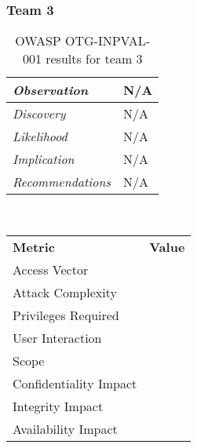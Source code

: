 \documentclass[headsepline,footsepline,footinclude=false,oneside,fontsize=11pt,paper=a4,listof=totoc,bibliography=totoc]{scrbook} %
\begin{document}
\subsubsection{Team 3}

\begin{table}[H]
	\centering
	\begin{tabular}{l p{11cm}}
		\textit{Observation} &  N/A\\
		\hline
		\textit{Discovery} &  N/A \\
		\hline
		\textit{Likelihood} & N/A\\
		\hline
		\textit{Implication} & N/A\\
		\hline
		\textit{Recommendations} & N/A\\
	\end{tabular}
	\caption{OWASP OTG-INPVAL-001 results for team 3}
	\label{table:scenario2}
\end{table}
\
\vspace{0.5cm}
\
\begin{center}
	\begin{tabular}{ll}
		\rowcolor[HTML]{34CDF9}
		{\color[HTML]{ECF4FF} \textbf{Metric}}        & {\color[HTML]{ECF4FF} \textbf{Value}} \\
		\rowcolor[HTML]{BBDAFF}
		{\color[HTML]{333333} Access Vector}          & {\color[HTML]{333333} }               \\
		\rowcolor[HTML]{ECF4FF}
		{\color[HTML]{333333} Attack Complexity}      & {\color[HTML]{333333} }               \\
		\rowcolor[HTML]{BBDAFF}
		{\color[HTML]{333333} Privileges Required}    & {\color[HTML]{333333} }               \\
		\rowcolor[HTML]{ECF4FF}
		{\color[HTML]{333333} User Interaction}       & {\color[HTML]{333333} }               \\
		\rowcolor[HTML]{BBDAFF}
		{\color[HTML]{333333} Scope}                  & {\color[HTML]{333333} }               \\
		\rowcolor[HTML]{ECF4FF}
		{\color[HTML]{333333} Confidentiality Impact} & {\color[HTML]{333333} }               \\
		\rowcolor[HTML]{BBDAFF}
		{\color[HTML]{333333} Integrity Impact}       & {\color[HTML]{333333} }               \\
		\rowcolor[HTML]{ECF4FF}
		{\color[HTML]{333333} Availability Impact}    & {\color[HTML]{333333} }
	\end{tabular}
\end{center}
\end{document}

